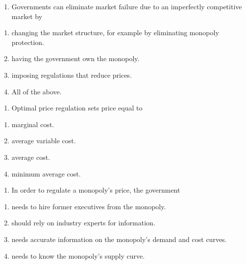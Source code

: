 \documentclass[11pt,]{article}
\providecommand{\tightlist}{%
  \setlength{\itemsep}{0pt}\setlength{\parskip}{0pt}}
\begin{document}
\begin{enumerate}
\def\labelenumi{\arabic{enumi})}
\setcounter{enumi}{8}
\tightlist
\item
  Governments can eliminate market failure due to an imperfectly
  competitive market by
\end{enumerate}

\begin{enumerate}
\def\labelenumi{\Alph{enumi})}
\tightlist
\item
  changing the market structure, for example by eliminating monopoly
  protection.
\item
  having the government own the monopoly.
\item
  imposing regulations that reduce prices.
\item
  All of the above.
\end{enumerate}

\begin{enumerate}
\def\labelenumi{\arabic{enumi})}
\setcounter{enumi}{9}
\tightlist
\item
  Optimal price regulation sets price equal to
\end{enumerate}

\begin{enumerate}
\def\labelenumi{\Alph{enumi})}
\tightlist
\item
  marginal cost.
\item
  average variable cost.
\item
  average cost.
\item
  minimum average cost.
\end{enumerate}

\begin{enumerate}
\def\labelenumi{\arabic{enumi})}
\setcounter{enumi}{10}
\tightlist
\item
  In order to regulate a monopoly's price, the government
\end{enumerate}

\begin{enumerate}
\def\labelenumi{\Alph{enumi})}
\tightlist
\item
  needs to hire former executives from the monopoly.
\item
  should rely on industry experts for information.
\item
  needs accurate information on the monopoly's demand and cost curves.
\item
  needs to know the monopoly's supply curve.
\end{enumerate}
\end{document}
